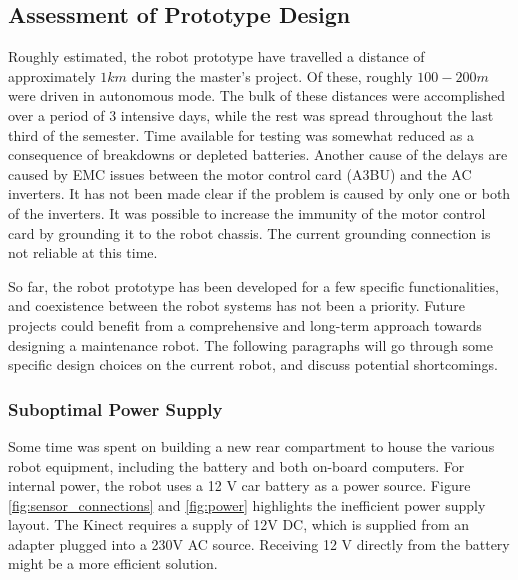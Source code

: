 \subsection{Assessment of Prototype Design}

Roughly estimated, the robot prototype have travelled a distance of approximately $1km$ during the master's project. Of these, roughly $100-200m$ were driven in autonomous mode. The bulk of these distances were accomplished over a period of 3 intensive days, while the rest was spread throughout the last third of the semester. Time available for testing was somewhat reduced as a consequence of breakdowns or depleted batteries. Another cause of the delays are caused by \ac{EMC} issues between the motor control card (A3BU) and the AC inverters. It has not been made clear if the problem is caused by only one or both of the inverters. It was possible to increase the immunity of the motor control card by grounding it to the robot chassis. The current grounding connection is not reliable at this time.

So far, the robot prototype has been developed for a few specific functionalities, and coexistence between the robot systems has not been a priority. Future projects could benefit from a comprehensive and long-term approach towards designing a maintenance robot. The following paragraphs will go through some specific design choices on the current robot, and discuss potential shortcomings. 

\subsubsection{Suboptimal Power Supply}

Some time was spent on building a new rear compartment to house the various robot equipment, including the battery and both on-board computers. For internal power, the robot uses a 12 V car battery as a power source. Figure \ref{fig:sensor_connections} and \ref{fig:power} highlights the inefficient power supply layout. The Kinect requires a supply of 12V DC, which is supplied from an adapter plugged into a 230V AC source. Receiving 12 V directly from the battery might be a more efficient solution.

